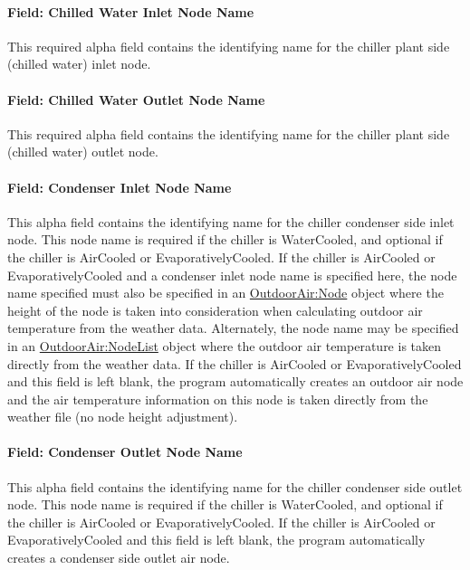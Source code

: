 \paragraph{Field: Chilled Water Inlet Node Name}\label{field-chilled-water-inlet-node-name-4}

This required alpha field contains the identifying name for the chiller plant side (chilled water) inlet node.

\paragraph{Field: Chilled Water Outlet Node Name}\label{field-chilled-water-outlet-node-name-4}

This required alpha field contains the identifying name for the chiller plant side (chilled water) outlet node.

\paragraph{Field: Condenser Inlet Node Name}\label{field-condenser-inlet-node-name-4}

This alpha field contains the identifying name for the chiller condenser side inlet node. This node name is required if the chiller is WaterCooled, and optional if the chiller is AirCooled or EvaporativelyCooled. If the chiller is AirCooled or EvaporativelyCooled and a condenser inlet node name is specified here, the node name specified must also be specified in an \hyperref[outdoorairnode]{OutdoorAir:Node} object where the height of the node is taken into consideration when calculating outdoor air temperature from the weather data. Alternately, the node name may be specified in an \hyperref[outdoorairnodelist]{OutdoorAir:NodeList} object where the outdoor air temperature is taken directly from the weather data. If the chiller is AirCooled or EvaporativelyCooled and this field is left blank, the program automatically creates an outdoor air node and the air temperature information on this node is taken directly from the weather file (no node height adjustment).

\paragraph{Field: Condenser Outlet Node Name}\label{field-condenser-outlet-node-name-4}

This alpha field contains the identifying name for the chiller condenser side outlet node. This node name is required if the chiller is WaterCooled, and optional if the chiller is AirCooled or EvaporativelyCooled. If the chiller is AirCooled or EvaporativelyCooled and this field is left blank, the program automatically creates a condenser side outlet air node.

